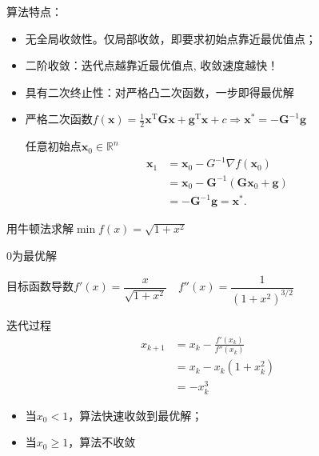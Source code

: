 \begin{note}
    算法特点：
    \begin{itemize}
        \item 无全局收敛性。仅局部收敛，即要求初始点靠近最优值点；
        \item 二阶收敛：迭代点越靠近最优值点, 收敛速度越快！
        \item 具有二次终止性：对严格凸二次函数，一步即得最优解
        \item 严格二次函数$f(\boldsymbol{x})=\frac12\boldsymbol{x}^{\mathrm{T}}\boldsymbol{G}\boldsymbol{x}+\boldsymbol{g}^{\mathrm{T}}\boldsymbol{x}+c\Rightarrow \boldsymbol{x}^* = -\boldsymbol{G}^{-1}\boldsymbol{g}$
        
        任意初始点$\boldsymbol{x}_{0}\in\mathbb{R}^n$
        \[
            \begin{aligned}
                \boldsymbol{x}_{1}& =\boldsymbol{x}_{0}-G^{-1}\nabla f(\boldsymbol{x}_{0})  \\
                &=\boldsymbol{x}_{0}-\boldsymbol{G}^{-1}(\boldsymbol{G}\boldsymbol{x}_{0}+\boldsymbol{g}) \\
                &=-\boldsymbol{G}^{-1}\boldsymbol{g}=\boldsymbol{x}^{*}.
            \end{aligned}
        \]
    \end{itemize}
\end{note}
\begin{example}
    用牛顿法求解$\min f(x)=\sqrt{1+x^2}$\quad{}
    
    $0$为最优解
    
    目标函数导数$f'(x)=\dfrac{x}{\sqrt{1+x^2}}\quad f''(x)=\dfrac{1}{(1+x^2)^{3/2}}$
    
    迭代过程
    \[
        \begin{aligned}
            x_{k+1}& =x_{k}-\frac{f'(x_{k})}{f''(x_{k})}  \\
            &=x_{k}-x_{k}(1+x_{k}^{2}) \\
            &=-x_{k}^{3}
        \end{aligned}
    \]
    \begin{itemize}
        \item 当$x_0<1$，算法快速收敛到最优解；
        \item 当$x_0\geqslant 1$，算法不收敛
    \end{itemize}
\end{example}

